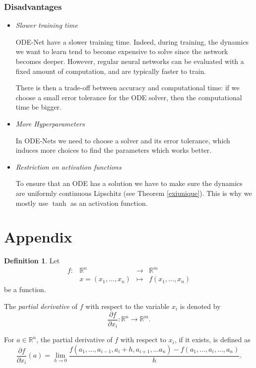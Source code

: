 \documentclass[10pt,a4paper]{article}
\theoremstyle{definition}
\newtheorem{definition}{Definition}
\theoremstyle{plain}
\begin{document}
\subsubsection*{Disadvantages}
\begin{itemize}
\item \textit{Slower training time}

ODE-Net have a slower training time. Indeed, during training, the dynamics we want to learn tend to become expensive to solve since the network becomes deeper. However, regular neural networks can be evaluated with a fixed amount of computation, and are typically faster to train.

There is then a trade-off between accuracy and computational time: if we choose a small error tolerance for the ODE solver, then the computational time be bigger.

\item \textit{More Hyperparameters}

In ODE-Nets we need to choose a solver and its error tolerance, which induces more choices to find the parameters which works better.

\item \textit{Restriction on activation functions}

To ensure that an ODE has a solution we have to make sure the dynamics are uniformly continuous Lipschitz (see Theorem \ref{exiunique}). This is why we mostly use $\tanh$ as an activation function.
\end{itemize}

\newpage

\section{Appendix}\label{annex}

\begin{definition}
Let   $$\begin{array}{rclc}
f: & \mathbb{R}^n & \rightarrow &  \mathbb{R}^m \\
&x = (x_1, \dots, x_n) & \mapsto & f(x_1, \dots, x_n)
\end{array}$$ be a function.

The \textit{partial derivative} of $f$ with respect to the variable $x_i$ is denoted by
$$
\frac{\partial f}{\partial x_i} :\mathbb{R}^n \rightarrow \mathbb{R}^m.
$$

For $a\in \mathbb{R}^n$, the partial derivative of $f$ with respect to $x_i$, if it exists, is defined as
$$
\frac{\partial f}{\partial x_i}(a) = \lim_{h\rightarrow0}\frac{f(a_1,\dots , a_{i-1}, a_i + h, a_{i+1}, \dots a_n) - f(a_1,\dots, a_i,\dots, a_n)}{h}.
$$
\end{definition}
\end{document}
